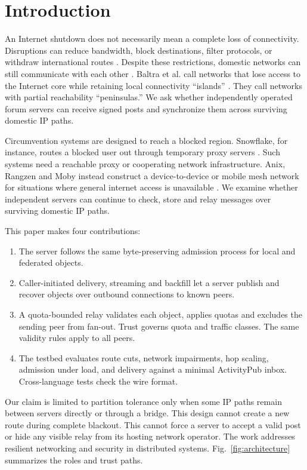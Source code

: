 \documentclass[conference,a4paper,10pt]{IEEEtran}
\begin{document}
\section{Introduction}

An Internet shutdown does not necessarily mean a complete loss of connectivity. Disruptions can reduce bandwidth, block destinations, filter protocols, or withdraw international routes \cite{ooni2025bangladesh}. Despite these restrictions, domestic networks can still communicate with each other \cite{bischof2023shutdowns,baltra2024connectivity}. Baltra et al. call networks that lose access to the Internet core while retaining local connectivity “islands” \cite{baltra2024connectivity}. They call networks with partial reachability “peninsulas.” We ask whether independently operated forum servers can receive signed posts and synchronize them across surviving domestic IP paths.

Circumvention systems are designed to reach a blocked region. Snowflake, for instance, routes a blocked user out through temporary proxy servers \cite{bocovich2024snowflake}. Such systems need a reachable proxy or cooperating network infrastructure. Anix, Rangzen and Moby instead construct a device-to-device or mobile mesh network for situations where general internet access is unavailable \cite{kamali2025anix,lerner2016rangzen,pradeep2022moby}. We examine whether independent servers can continue to check, store and relay messages over surviving domestic IP paths.

This paper makes four contributions:

\begin{enumerate}
  \item The server follows the same byte-preserving admission process for local and federated objects.
  \item Caller-initiated delivery, streaming and backfill let a server publish and recover objects over outbound connections to known peers.
  \item A quota-bounded relay validates each object, applies quotas and excludes the sending peer from fan-out. Trust governs quota and traffic classes. The same validity rules apply to all peers.
  \item The testbed evaluates route cuts, network impairments, hop scaling, admission under load, and delivery against a minimal ActivityPub inbox. Cross-language tests check the wire format.
\end{enumerate}

Our claim is limited to partition tolerance only when some IP paths remain between servers directly or through a bridge. This design cannot create a new route during complete blackout. This cannot force a server to accept a valid post or hide any visible relay from its hosting network operator. The work addresses resilient networking and security in distributed systems. Fig.~\ref{fig:architecture} summarizes the roles and trust paths.
\end{document}

